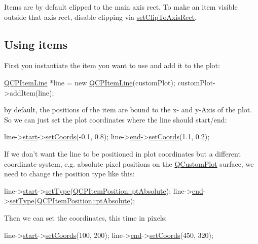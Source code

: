Items are by default clipped to the main axis rect. To make an item visible outside that axis rect, disable clipping via \hyperlink{class_q_c_p_abstract_item_a39e05b9d4176b9accafc746d16ca6a06}{set\-Clip\-To\-Axis\-Rect}.\hypertarget{class_q_c_p_abstract_item_items-using}{}\subsection{Using items}\label{class_q_c_p_abstract_item_items-using}
First you instantiate the item you want to use and add it to the plot\-: 
\begin{DoxyCode}
\hyperlink{class_q_c_p_item_line}{QCPItemLine} *line = \textcolor{keyword}{new} \hyperlink{class_q_c_p_item_line}{QCPItemLine}(customPlot);
customPlot->addItem(line);
\end{DoxyCode}
 by default, the positions of the item are bound to the x-\/ and y-\/\-Axis of the plot. So we can just set the plot coordinates where the line should start/end\-: 
\begin{DoxyCode}
line->\hyperlink{class_q_c_p_item_line_a602da607a09498b0f152ada1d6851bc5}{start}->\hyperlink{class_q_c_p_item_position_aa988ba4e87ab684c9021017dcaba945f}{setCoords}(-0.1, 0.8);
line->\hyperlink{class_q_c_p_item_line_a15598864c1c22a2497a1979c4980c4e1}{end}->\hyperlink{class_q_c_p_item_position_aa988ba4e87ab684c9021017dcaba945f}{setCoords}(1.1, 0.2);
\end{DoxyCode}
 If we don't want the line to be positioned in plot coordinates but a different coordinate system, e.\-g. absolute pixel positions on the \hyperlink{class_q_custom_plot}{Q\-Custom\-Plot} surface, we need to change the position type like this\-: 
\begin{DoxyCode}
line->\hyperlink{class_q_c_p_item_line_a602da607a09498b0f152ada1d6851bc5}{start}->\hyperlink{class_q_c_p_item_position_aa476abf71ed8fa4c537457ebb1a754ad}{setType}(\hyperlink{class_q_c_p_item_position_aad9936c22bf43e3d358552f6e86dbdc8a564f5e53e550ead1ec5fc7fc7d0b73e0}{QCPItemPosition::ptAbsolute});
line->\hyperlink{class_q_c_p_item_line_a15598864c1c22a2497a1979c4980c4e1}{end}->\hyperlink{class_q_c_p_item_position_aa476abf71ed8fa4c537457ebb1a754ad}{setType}(\hyperlink{class_q_c_p_item_position_aad9936c22bf43e3d358552f6e86dbdc8a564f5e53e550ead1ec5fc7fc7d0b73e0}{QCPItemPosition::ptAbsolute});
\end{DoxyCode}
 Then we can set the coordinates, this time in pixels\-: 
\begin{DoxyCode}
line->\hyperlink{class_q_c_p_item_line_a602da607a09498b0f152ada1d6851bc5}{start}->\hyperlink{class_q_c_p_item_position_aa988ba4e87ab684c9021017dcaba945f}{setCoords}(100, 200);
line->\hyperlink{class_q_c_p_item_line_a15598864c1c22a2497a1979c4980c4e1}{end}->\hyperlink{class_q_c_p_item_position_aa988ba4e87ab684c9021017dcaba945f}{setCoords}(450, 320);
\end{DoxyCode}
